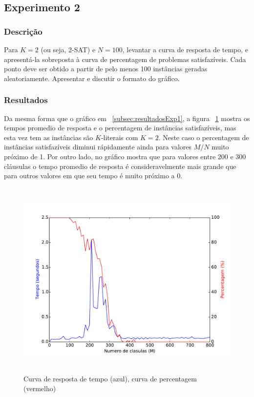  \subsection{Experimento 2}
	\subsubsection{Descrição}
		Para $K = 2$ (ou seja, 2-SAT) e $N = 100$, levantar a curva de resposta de tempo, e apresentá-la sobreposta à curva de percentagem de problemas satisfazíveis. Cada ponto deve ser obtido a partir de pelo menos 100 instâncias geradas aleatoriamente. Apresentar e discutir o formato do gráfico.
	\subsubsection{Resultados}
		Da mesma forma que o gráfico em ~\ref{subsec:resultadosExp1}, a figura ~\ref{fig:max2sat100at} mostra os tempos promedio de resposta e o percentagem de instâncias satisfazíveis, mas esta vez tem as instâncias são $K$-literais com $K=2$. Neste caso o percentagem de instâncias satisfazíveis diminui rápidamente ainda para valores $M/N$ muito próximo de 1. Por outro lado, no gráfico mostra que para valores entre 200 e 300 cláusulas o tempo promedio de resposta é consideravelmente mais grande que para outros valores em que seu tempo é muito próximo a 0.
		\begin{figure}[H]
			\centering
			\includegraphics[height=10cm]{images/max2sat_100at}
			\caption{Curva de resposta de tempo (azul), curva de percentagem (vermelho)}
			\label{fig:max2sat100at}
		\end{figure}
		

